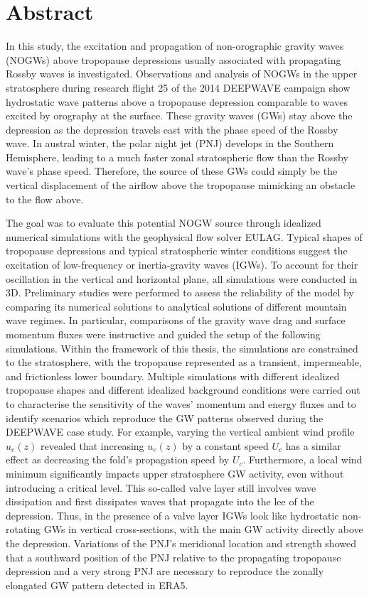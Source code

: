 \chapter*{Abstract}
\thispagestyle{plain}

In this study, the excitation and propagation of non-orographic gravity waves (NOGWs) above tropopause depressions usually associated with propagating Rossby waves is investigated. Observations and analysis of NOGWs in the upper stratosphere during research flight 25 of the 2014 DEEPWAVE campaign show hydrostatic wave patterns above a tropopause depression comparable to waves excited by orography at the surface. These gravity waves (GWs) stay above the depression as the depression travels east with the phase speed of the Rossby wave. In austral winter, the polar night jet (PNJ) develops in the Southern Hemisphere, leading to a much faster zonal stratospheric flow than the Rossby wave's phase speed. Therefore, the source of these GWs could simply be the vertical displacement of the airflow above the tropopause mimicking an obstacle to the flow above.

The goal was to evaluate this potential NOGW source through idealized numerical simulations with the geophysical flow solver EULAG. Typical shapes of tropopause depressions and typical stratospheric winter conditions suggest the excitation of low-frequency or inertia-gravity waves (IGWs). To account for their oscillation in the vertical and horizontal plane, all simulations were conducted in 3D. Preliminary studies were performed to assess the reliability of the model by comparing its numerical solutions to analytical solutions of different mountain wave regimes. In particular, comparisons of the gravity wave drag and surface momentum fluxes were instructive and guided the setup of the following simulations.
Within the framework of this thesis, the simulations are constrained to the stratosphere, with the tropopause represented as a transient, impermeable, and frictionless lower boundary. Multiple simulations with different idealized tropopause shapes and different idealized background conditions were carried out to characterise the sensitivity of the waves' momentum and energy fluxes and to identify scenarios which reproduce the GW patterns observed during the DEEPWAVE case study. For example, varying the vertical ambient wind profile $u_e(z)$ revealed that increasing $u_e(z)$ by a constant speed $U_c$ has a similar effect as decreasing the fold's propagation speed by $U_c$. Furthermore, a local wind minimum significantly impacts upper stratosphere GW activity, even without introducing a critical level. This so-called valve layer still involves wave dissipation and first dissipates waves that propagate into the lee of the depression. Thus, in the presence of a valve layer IGWs look like hydrostatic non-rotating GWs in vertical cross-sections, with the main GW activity directly above the depression. Variations of the PNJ's meridional location and strength showed that a southward position of the PNJ relative to the propagating tropopause depression and a very strong PNJ are necessary to reproduce the zonally elongated GW pattern detected in ERA5.

